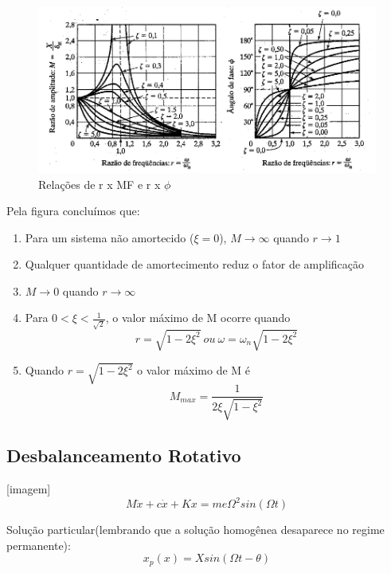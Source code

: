 \documentclass[a4paper, 12pt]{article}
\begin{document}
	
	\begin{figure}[h]
	\centering
	\includegraphics[scale=0.7]{a9.png}
	\caption{Relações de r x MF e r x $\phi$}
	\end{figure}
\newpage
	Pela figura concluímos que:
	\begin{enumerate}
	\item Para um sistema não amortecido ($\xi = 0$), $M\rightarrow \infty$ quando $r\rightarrow 1$
	\item Qualquer quantidade de amortecimento reduz o fator de amplificação
	\item $M\rightarrow 0$ quando $r\rightarrow \infty$
	\item Para $0 < \xi< \frac{1}{\sqrt{2}}$, o valor máximo de M ocorre quando
		\begin{equation}
		r= \sqrt{1-2\xi^2} \ ou\ \omega = \omega_n\sqrt{1- 2 \xi^2}
		\end{equation}
	\item Quando $r= \sqrt{1-2\xi^2}$ o valor máximo de M é
		\begin{equation}
		M_{max} = \frac{1}{2\xi \sqrt{1- \xi^2}}
		\end{equation}
	\end{enumerate}		
	
\subsection{Desbalanceamento Rotativo}
	[imagem]
	\begin{equation}
	M\ddot{x} + c \dot{x} + Kx = m e \Omega^2 sin(\Omega t)
	\end{equation}
	
	Solução particular(lembrando que a solução homogênea desaparece no regime permanente):
	\begin{equation}
	x_p(x) = X sin(\Omega t - \theta)
	\end{equation}
	
\end{document}
